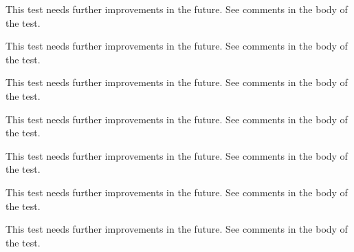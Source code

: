 \begin{DoxyRefList}
%
 This test needs further improvements in the future. See comments in the body of the test.  
\item[Subprogram \mbox{\hyperlink{namespaceTest__System__mod_a733db17082cd5058dbc8d19e6f620909}{Test\+\_\+\+System\+\_\+mod\+::test\+\_\+execute\+Cmd\+\_\+2}} ()]\label{todo__todo000076}%
%
 This test needs further improvements in the future. See comments in the body of the test.  
\item[Subprogram \mbox{\hyperlink{namespaceTest__System__mod_a9a276bf5a7b9db66c140bd2202ebc7e9}{Test\+\_\+\+System\+\_\+mod\+::test\+\_\+get\+System\+Info\+\_\+1}} ()]\label{todo__todo000077}%
%
 This test needs further improvements in the future. See comments in the body of the test.  
\item[Subprogram \mbox{\hyperlink{namespaceTest__System__mod_aabfd080659733c4a852c62ccd400599b}{Test\+\_\+\+System\+\_\+mod\+::test\+\_\+\+OS\+\_\+type\+\_\+1}} ()]\label{todo__todo000071}%
%
 This test needs further improvements in the future. See comments in the body of the test.  
\item[Subprogram \mbox{\hyperlink{namespaceTest__System__mod_a86976d55b3a779d9a8c0064155e9cd4a}{Test\+\_\+\+System\+\_\+mod\+::test\+\_\+\+OS\+\_\+type\+\_\+2}} ()]\label{todo__todo000072}%
%
 This test needs further improvements in the future. See comments in the body of the test.  
\item[Subprogram \mbox{\hyperlink{namespaceTest__System__mod_ada729e6f3789a1df730ac21f58d5a334}{Test\+\_\+\+System\+\_\+mod\+::test\+\_\+\+OS\+\_\+type\+\_\+3}} ()]\label{todo__todo000073}%
%
 This test needs further improvements in the future. See comments in the body of the test.  
\item[Subprogram \mbox{\hyperlink{namespaceTest__System__mod_a6ba8a4348e2457b775dd061d40f33cb8}{Test\+\_\+\+System\+\_\+mod\+::test\+\_\+\+Sys\+Cmd\+\_\+type\+\_\+1}} ()]\label{todo__todo000074}%
%
 This test needs further improvements in the future. See comments in the body of the test. 
\end{DoxyRefList}